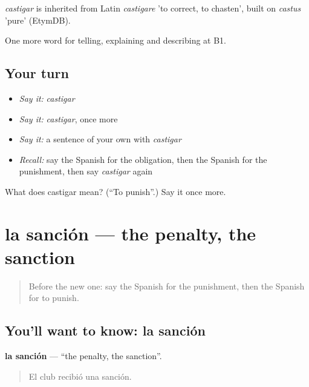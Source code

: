 \begin{cousinweb}
\emph{castigar} is inherited from Latin \emph{castigare} 'to correct, to chasten', built on \emph{castus} 'pure' (EtymDB).
\end{cousinweb}

\begin{grammarlens}[title={What you've built}]
One more word for telling, explaining and describing at B1.
\end{grammarlens}

\subsection*{Your turn}
\begin{itemize}
\raggedright
  \item \emph{Say it:} \emph{castigar}
  \item \emph{Say it:} \emph{castigar}, once more
  \item \emph{Say it:} a sentence of your own with \emph{castigar}
  \item \emph{Recall:} say the Spanish for the obligation, then the Spanish for the punishment, then say \emph{castigar} again
\end{itemize}

\begin{tcolorbox}[breakable,colback=teal!4,colframe=teal!35!black,title={Before you move on}]
What does castigar mean? (\textquotedblleft{}To punish\textquotedblright{}.) Say it once more.
\end{tcolorbox}
\section[la sanción]{la sanción — the penalty, the sanction}

\label{lesson:ES-C623-sancion}



\begin{quote}
Before the new one: say the Spanish for the punishment, then the Spanish for to punish.
\end{quote}

\subsection*{You'll want to know: la sanción}
\textbf{la sanción} — \textquotedblleft{}the penalty, the sanction\textquotedblright{}.

\begin{quote}
El club recibió una sanción.
\end{quote}

